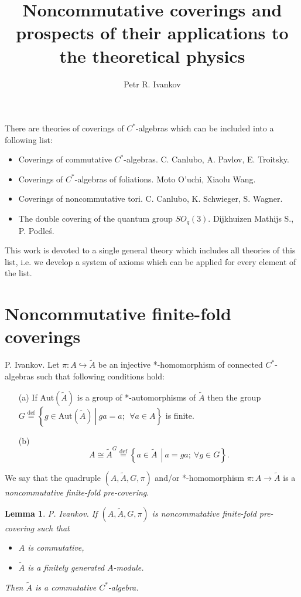 \documentclass{beamer}
\title{Noncommutative coverings and prospects of their applications to the theoretical physics}
\author{Petr R. Ivankov \inst{1} }
\institute
{
	\inst{1}
	CSTS "Dinamika" , Moscow, Russia\\  \ \\
Geometry, Groups, Operator Algebras, and Integrability 2022\\
(June 27–July 2, 2022, Lomonosov Moscow State University, Moscow) \\ \ \\
	( arXiv:1904.13130
	)
}
\date{}
\theoremstyle{plain}
\newtheorem{lem}{Lemma}%
\newcommand{\be}{\begin{equation}}
\newcommand{\ee}{\end{equation}}
\newcommand{\Aut}{\mathrm{Aut}}
\newcommand{\bydef}{\stackrel{\mathrm{def}}{=}}
\newcommand{\hookto}{\hookrightarrow}        %
\begin{document}
\begin{frame}
  \titlepage
\end{frame}
\begin{frame}
There are theories of coverings of $C^*$-algebras which can be included into a following list:
\begin{itemize}
	\item Coverings of commutative $C^*$-algebras.  \alert{C. Canlubo, A. Pavlov, E. Troitsky}.
	\item Coverings of $C^*$-algebras of foliations.  \alert{Moto O'uchi,   Xiaolu Wang}.
	\item  Coverings of noncommutative tori. \alert{C. Canlubo, K. Schwieger, S. Wagner}.
	\item {The double covering of the quantum group $SO_q(3)$}. \alert{Dijkhuizen Mathijs S., P. Podle\'{s}}. 
\end{itemize}
This work is devoted to a single general theory which includes all theories of this list, i.e. we develop a  system of axioms which can be applied for every element of the list.
\end{frame}
	\section{Noncommutative finite-fold coverings}

\begin{frame}
	   \begin{definition}\label{pre_defn} \alert{P. Ivankov}.
		Let $\pi: A \hookto \widetilde{A}$ be an injective *-homomorphism of connected  $C^*$-algebras such that following conditions hold:
		\begin{enumerate}
			\item[(a)] If $\Aut\left(\widetilde{A} \right)$ is a group of *-automorphisms of $\widetilde{A}$ then the group  
			$
			G \bydef \left\{ \left.g \in \Aut\left(\widetilde{A} \right)~\right|~ ga = a;~~\forall a \in A\right\}
			$
			is finite.
			\item[(b)] 	\be\label{cond_b_eqn}
			A \cong \widetilde{A}^G\stackrel{\text{def}}{=}\left\{\left.a\in \widetilde{A}~~\right|~ a = g a;~ \forall g \in G\right\}.\ee
		\end{enumerate}
		We say that the quadruple $\left(A, \widetilde{A}, G, \pi \right)$ and/or *-homomorphism $\pi: A \to \widetilde{A}$   is a \textit{noncommutative finite-fold  pre-covering}. 
	\end{definition}
\begin{lem}  \alert{P. Ivankov}.
If $\left(A, \widetilde{A}, G, \pi \right)$ is noncommutative finite-fold  pre-covering such that
\begin{itemize}
	\item $A$ is commutative,
	\item $\widetilde{A}$ is a finitely generated $A$-module.
\end{itemize}
Then $\widetilde{A}$ is a commutative $C^*$-algebra.
\end{lem}
\end{frame}
\end{document}
